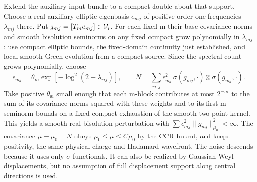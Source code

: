 \documentclass[11pt]{article}
\begin{document}
Extend the auxiliary input bundle to a compact double about that
support. Choose a real auxiliary elliptic eigenbasis $e_{mj}$ of
positive order-one frequencies $\lambda_{mj}$ there. Put
$g_{mj}=[T_m e_{mj}]\in\mathcal V_{\rm r}$. For each fixed m their
base covariance norms and smooth bisolution seminorms on any fixed
compact grow polynomially in $\lambda_{mj}$: use compact elliptic
bounds, the fixed-domain continuity just established, and local
smooth Green evolution from a compact source. Since the spectral
count grows polynomially, choose
\[
 \epsilon_{mj}=\theta_m\exp[-\log^2(2+\lambda_{mj})],\qquad
 N=\sum_{m,j}\epsilon_{mj}^2\,
       \sigma(g_{mj},\cdot)\otimes\sigma(g_{mj},\cdot).
\]
Take positive $\theta_m$ small enough that each m-block contributes
at most $2^{-m}$ to the sum of its covariance norms squared with
these weights and to its first m seminorm bounds on a fixed compact
exhaustion of the smooth two-point kernel. This yields a smooth
real bisolution perturbation with
$\sum\epsilon_{mj}^2\|g_{mj}\|_{\mu_0}^2<\infty$. The covariance
$\mu=\mu_0+N$ obeys
$\mu_0\le\mu\le C\mu_0$ by the CCR bound, and keeps positivity,
the same physical charge and Hadamard wavefront. The noise
descends because it uses only $\sigma$-functionals. It can also
be realized by Gaussian Weyl displacements, but no assumption of
full displacement support along central directions is used.
\end{document}
